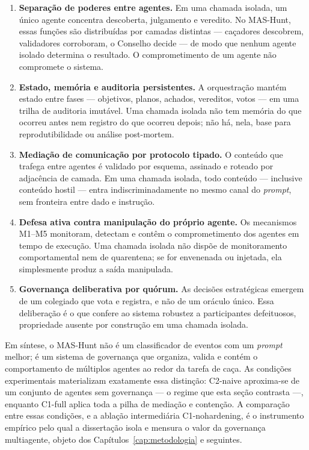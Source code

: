 \begin{enumerate}
  \item \textbf{Separação de poderes entre agentes.} Em uma chamada isolada, um
    único agente concentra descoberta, julgamento e veredito. No MAS-Hunt, essas
    funções são distribuídas por camadas distintas — caçadores descobrem,
    validadores corroboram, o Conselho decide — de modo que nenhum agente isolado
    determina o resultado. O comprometimento de um agente não compromete o
    sistema.
  \item \textbf{Estado, memória e auditoria persistentes.} A orquestração mantém
    estado entre fases — objetivos, planos, achados, vereditos, votos — em uma
    trilha de auditoria imutável. Uma chamada isolada não tem memória do que
    ocorreu antes nem registro do que ocorreu depois; não há, nela, base para
    reprodutibilidade ou análise post-mortem.
  \item \textbf{Mediação de comunicação por protocolo tipado.} O conteúdo que
    trafega entre agentes é validado por esquema, assinado e roteado por
    adjacência de camada. Em uma chamada isolada, todo conteúdo — inclusive
    conteúdo hostil — entra indiscriminadamente no mesmo canal do \emph{prompt},
    sem fronteira entre dado e instrução.
  \item \textbf{Defesa ativa contra manipulação do próprio agente.} Os mecanismos
    M1--M5 monitoram, detectam e contêm o comprometimento dos agentes em tempo de
    execução. Uma chamada isolada não dispõe de monitoramento comportamental nem
    de quarentena; se for envenenada ou injetada, ela simplesmente produz a saída
    manipulada.
  \item \textbf{Governança deliberativa por quórum.} As decisões estratégicas
    emergem de um colegiado que vota e registra, e não de um oráculo único. Essa
    deliberação é o que confere ao sistema robustez a participantes defeituosos,
    propriedade ausente por construção em uma chamada isolada.
\end{enumerate}

Em síntese, o MAS-Hunt não é um classificador de eventos com um \emph{prompt}
melhor; é um sistema de governança que organiza, valida e contém o comportamento
de múltiplos agentes ao redor da tarefa de caça. As condições experimentais
materializam exatamente essa distinção: C2-naive aproxima-se de um conjunto de
agentes sem governança — o regime que esta seção contrasta —, enquanto C1-full
aplica toda a pilha de mediação e contenção. A comparação entre essas condições, e
a ablação intermediária C1-nohardening, é o instrumento empírico pelo qual a
dissertação isola e mensura o valor da governança multiagente, objeto dos
Capítulos~\ref{cap:metodologia} e seguintes.
